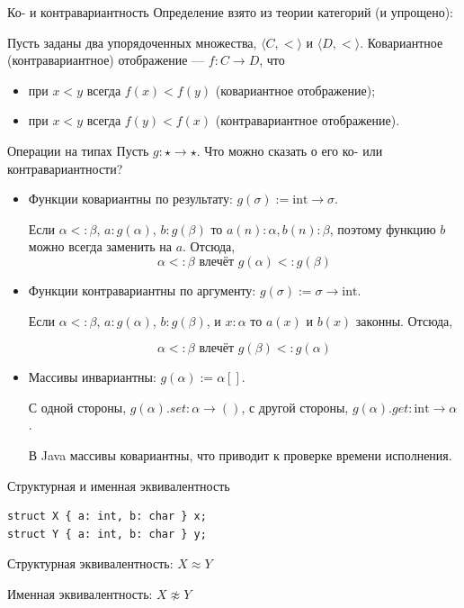 \documentclass[aspectratio=169,dvipsnames,usenames]{beamer}
\begin{document}
\begin{frame}{Ко- и контравариантность}
Определение взято из теории категорий (и упрощено):
\begin{dfn}
Пусть заданы два упорядоченных множества, $\langle C, < \rangle$ и $\langle D, < \rangle$.
Ковариантное (контравариантное) отображение --- $f: C \rightarrow D$, что 
\begin{itemize}
\item при $x<y$ всегда $f(x) < f(y)$ (ковариантное отображение);
\item при $x<y$ всегда $f(y) < f(x)$ (контравариантное отображение).
\end{itemize}
\end{dfn}
\end{frame}

\begin{frame}{Операции на типах}
Пусть $g : \star \rightarrow \star$. Что можно сказать о его ко- или контравариантности?

\begin{itemize}
\item Функции ковариантны по результату: $g(\sigma) := \text{int}\rightarrow\sigma$. 

Если $\alpha <: \beta$, $a : g(\alpha)$, $b : g(\beta)$ то $a(n): \alpha, b(n): \beta$, 
поэтому функцию $b$ можно всегда заменить на $a$. Отсюда,
$$\alpha <: \beta \text{ влечёт } g(\alpha) <: g(\beta)$$

\item Функции контравариантны по аргументу: $g(\sigma) := \sigma\rightarrow\text{int}$. 

Если $\alpha <: \beta$, $a : g(\alpha)$, $b : g(\beta)$, и $x : \alpha$ то
$a(x)$ и $b(x)$ законны. Отсюда,

$$\alpha <: \beta \text{ влечёт } g(\beta) <: g(\alpha)$$

\item Массивы инвариантны: $g(\alpha) := \alpha[]$.

С одной стороны, $g(\alpha).set : \alpha \rightarrow ()$, с другой стороны, $g(\alpha).get : \text{int} \rightarrow \alpha$.

В Java массивы ковариантны, что приводит к проверке времени исполнения.

\end{itemize}
\end{frame}

\begin{frame}[fragile]{Структурная и именная эквивалентность}
\begin{verbatim}
struct X { a: int, b: char } x;
struct Y { a: int, b: char } y;
\end{verbatim}

Структурная эквивалентность: $X \approx Y$

Именная эквивалентность: $X \not\approx Y$

\end{frame}
\end{document}
